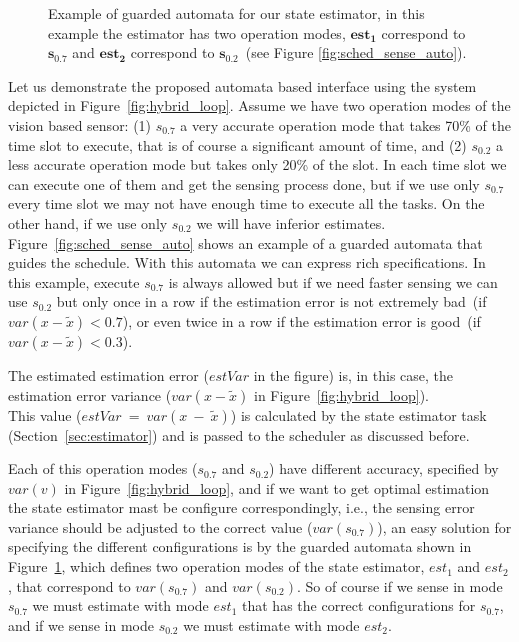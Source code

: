 \documentclass[ twoside, 12pt ]{article}
\begin{document}
{\begin{figure}[]
\begin{tikzpicture}[node distance=4cm,auto]
    \end{tikzpicture}
    
    \caption{Example of guarded automata for our state estimator, in this example the estimator has two operation modes, $\mathbf{est_1}$ correspond to $\mathbf{s_{0.7}}$ and $\mathbf{est_2}$ correspond to $\mathbf{s_{0.2}}$~(see Figure \ref{fig:sched_sense_auto}).
        \label{fig:sched_estimator_auto}}
\end{figure}

Let us demonstrate the proposed automata based interface using the system depicted in Figure~\ref{fig:hybrid_loop}.
Assume we have two operation modes of the vision based sensor: (1) $s_{0.7}$ a very accurate operation mode that takes 70\% of the time slot to execute, that is of course a significant amount of time, and (2) $s_{0.2}$ a less accurate operation mode but takes only 20\% of the slot.
In each time slot we can execute one of them and get the sensing process done, but if we use only $s_{0.7}$ every time slot we may not have enough time to execute all the tasks. On the other hand, if we use only $s_{0.2}$ we will have inferior estimates.
Figure~\ref{fig:sched_sense_auto} shows an example of a guarded automata that guides the schedule. With this automata we can express rich specifications. 
In this example, execute $s_{0.7}$ is always allowed but if we need faster sensing we can use $s_{0.2}$ but only once in a row if the estimation error is not extremely bad~(if~$var(x-\tilde{x}) < 0.7$), or even twice in a row if the estimation error is good~(if~$var(x-\tilde{x}) < 0.3$).

The estimated estimation error ($estVar$ in the figure) is, in this case, the estimation error variance ($var(x-\tilde{x})$ in Figure~\ref{fig:hybrid_loop}). 
\\This value ($estVar~=~var(x~-~\tilde{x})$) is calculated by the state estimator task (Section~\ref{sec:estimator}) and is passed to the scheduler as discussed before.

Each of this operation modes ($s_{0.7}$ and $s_{0.2}$) have different accuracy, specified by $var(v)$ in Figure~\ref{fig:hybrid_loop}, and if we want to get optimal estimation the state estimator mast be configure correspondingly, i.e., the sensing error variance should be adjusted to the correct value ($var(s_{0.7})$), an easy solution for specifying the different configurations is by the guarded automata shown in Figure~\ref{fig:sched_estimator_auto}, which defines two operation modes of the state estimator, $est_1$ and $est_2$, that correspond to $var(s_{0.7})$ and $var(s_{0.2})$. So of course if we sense in mode $s_{0.7}$ we must estimate with mode $est_1$ that has the correct configurations for $s_{0.7}$, and if we sense in mode $s_{0.2}$ we must estimate with mode $est_2$.    
}
\end{document}
